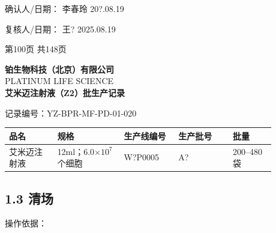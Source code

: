 \documentclass[UTF8,10pt,a4paper,fontset=fandol]{ctexart}
\newcommand{\fieldvalue}[1]{#1}
\newcommand{\handwritten}[1]{#1}
\begin{document}
\vspace{0.5em}

确认人/日期：%
\fieldvalue{\handwritten{李春玲}}
\quad
\fieldvalue{\handwritten{20?.08.19}}

\hfill
复核人/日期：%
\fieldvalue{\handwritten{王?}}
\quad
\fieldvalue{\handwritten{2025.08.19}}

\begin{center}
第100页 共148页
\end{center}

\newpage

\begin{center}
\textbf{铂生物科技（北京）有限公司}\\
PLATINUM LIFE SCIENCE\\[2mm]
\textbf{艾米迈注射液（Z2）批生产记录}
\end{center}

\noindent
记录编号：YZ-BPR-MF-PD-01-020

\begin{center}
\begin{tabular}{|p{0.16\linewidth}|p{0.22\linewidth}|p{0.18\linewidth}|p{0.18\linewidth}|p{0.14\linewidth}|}
\hline
品名 & 规格 & 生产线编号 & 生产批号 & 批量\\
\hline
\fieldvalue{艾米迈注射液}
&
\fieldvalue{12ml；6.0$\times 10^{7}$个细胞}
&
\fieldvalue{\handwritten{W?P0005}}
&
\fieldvalue{\handwritten{A?}}
&
\fieldvalue{200--480袋}\\
\hline
\end{tabular}
\end{center}

\subsection*{1.3 清场}

\noindent 操作依据：
\end{document}
